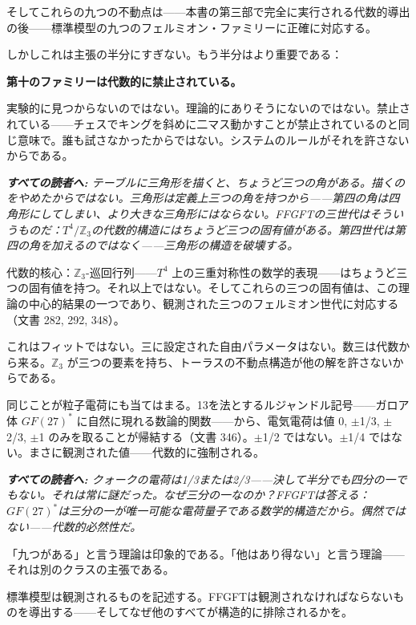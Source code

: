 \documentclass[11pt,openany]{book}
\newenvironment{laierspur}{%
  \par\vspace{4pt}%
  \noindent\small\itshape\color{blue!60!black}%
  \textbf{すべての読者へ:}\enspace\ignorespaces}{%
  \par\vspace{4pt}\normalsize\normalfont\normalcolor}
\begin{document}
そしてこれらの九つの不動点は——本書の第三部で完全に実行される代数的導出の後——標準模型の九つのフェルミオン・ファミリーに正確に対応する。

しかしこれは主張の半分にすぎない。もう半分はより重要である：

\textbf{第十のファミリーは代数的に禁止されている。}

実験的に見つからないのではない。理論的にありそうにないのではない。禁止されている——チェスでキングを斜めに二マス動かすことが禁止されているのと同じ意味で。誰も試さなかったからではない。システムのルールがそれを許さないからである。

\begin{laierspur}
テーブルに三角形を描くと、ちょうど三つの角がある。描くのをやめたからではない。三角形は定義上三つの角を持つから——第四の角は四角形にしてしまい、より大きな三角形にはならない。FFGFTの三世代はそういうものだ：$T^4/\mathbb{Z}_3$の代数的構造にはちょうど三つの固有値がある。第四世代は第四の角を加えるのではなく——三角形の構造を破壊する。
\end{laierspur}

代数的核心：$\mathbb{Z}_3$-巡回行列——$T^4$ 上の三重対称性の数学的表現——はちょうど三つの固有値を持つ。それ以上ではない。そしてこれらの三つの固有値は、この理論の中心的結果の一つであり、観測された三つのフェルミオン世代に対応する（文書 282, 292, 348）。

これはフィットではない。三に設定された自由パラメータはない。数三は代数から来る。$\mathbb{Z}_3$ が三つの要素を持ち、トーラスの不動点構造が他の解を許さないからである。

同じことが粒子電荷にも当てはまる。13を法とするルジャンドル記号——ガロア体 $GF(27)^*$ に自然に現れる数論的関数——から、電気電荷は値 0, $\pm$1/3, $\pm$2/3, $\pm$1 のみを取ることが帰結する（文書 346）。$\pm$1/2 ではない。$\pm$1/4 ではない。まさに観測された値——代数的に強制される。

\begin{laierspur}
クォークの電荷は1/3または2/3——決して半分でも四分の一でもない。それは常に謎だった。なぜ三分の一なのか？FFGFTは答える：$GF(27)^*$は三分の一が唯一可能な電荷量子である数学的構造だから。偶然ではない——代数的必然性だ。
\end{laierspur}

「九つがある」と言う理論は印象的である。「他はあり得ない」と言う理論——それは別のクラスの主張である。

標準模型は観測されるものを記述する。FFGFTは観測されなければならないものを導出する——そしてなぜ他のすべてが構造的に排除されるかを。
\end{document}
